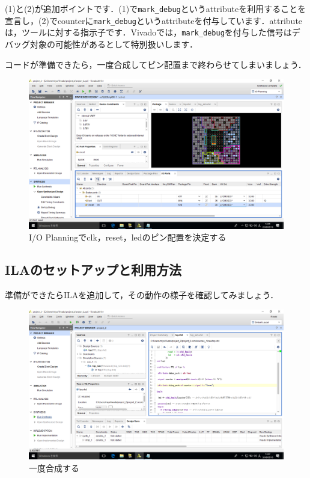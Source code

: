 \documentclass[a4paper,dvipdfmx]{jsarticle}
\begin{document}
(1)と(2)が追加ポイントです．(1)で\verb|mark_debug|というattributeを利用することを宣言し，(2)でcounterに\verb|mark_debug|というattributeを付与しています．attributeは，ツールに対する指示子です．Vivadoでは，\verb|mark_debug|を付与した信号はデバッグ対象の可能性があるとして特別扱いします．

コードが準備できたら，一度合成してピン配置まで終わらせてしまいましょう．

 \begin{figure}[H]
  \begin{center}
   \includegraphics[width=.8\textwidth]{chapter05_figures/VirtualBox_Windows10_19_03_2018_13_59_41.png}
  \end{center}
  \caption{I/O Planningでclk，reset，ledのピン配置を決定する}
 \end{figure}


\subsection{ILAのセットアップと利用方法}
準備ができたらILAを追加して，その動作の様子を確認してみましょう．

 \begin{figure}[H]
  \begin{center}
   \includegraphics[width=.8\textwidth]{chapter05_figures/VirtualBox_Windows10_19_03_2018_13_57_01.png}
  \end{center}
  \caption{一度合成する}
 \end{figure}
\end{document}
